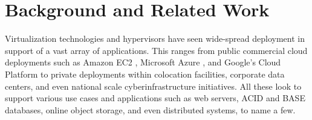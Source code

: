 \documentclass[10pt]{sigplanconf}
\begin{document}





 


\section{Background and Related Work}\label{Background}


Virtualization technologies and hypervisors have seen 
wide-spread deployment in support of a vast array of applications.  This ranges from public commercial cloud deployments such as Amazon EC2 \cite{amazon2010}, Microsoft Azure \cite{jennings2010cloud}, and Google's Cloud Platform \cite{www-google-platform} to private deployments within colocation facilities, corporate data centers, and even national scale cyberinfrastructure initiatives.  All these look to support various use cases and applications such as web servers, ACID and BASE databases, online object storage, and even distributed systems, to name a few.  
\end{document}
